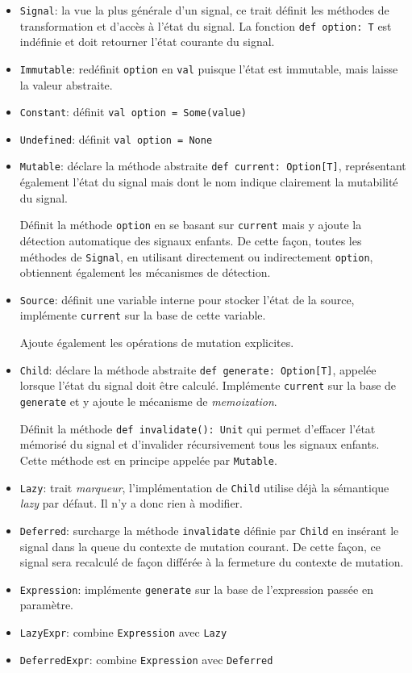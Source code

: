 \begin{itemize}
	\item \texttt{Signal}: la vue la plus générale d'un signal, ce trait définit les méthodes de transformation et d'accès à l'état du signal. La fonction \texttt{def option: T} est indéfinie et doit retourner l'état courante du signal.
	\item \texttt{Immutable}: redéfinit \texttt{option} en \texttt{val} puisque l'état est immutable, mais laisse la valeur abstraite.
	\item \texttt{Constant}: définit \texttt{val option = Some(value)}
	\item \texttt{Undefined}: définit \texttt{val option = None}
	\item \texttt{Mutable}: déclare la méthode abstraite \texttt{def current: Option[T]}, représentant également l'état du signal mais dont le nom indique clairement la mutabilité du signal.
	
	Définit la méthode \texttt{option} en se basant sur \texttt{current} mais y ajoute la détection automatique des signaux enfants. De cette façon, toutes les méthodes de \texttt{Signal}, en utilisant directement ou indirectement \texttt{option}, obtiennent également les mécanismes de détection.
	
	\item \texttt{Source}: définit une variable interne pour stocker l'état de la source, implémente \texttt{current} sur la base de cette variable.
	
	Ajoute également les opérations de mutation explicites.
	
	\item \texttt{Child}: déclare la méthode abstraite \texttt{def generate: Option[T]}, appelée lorsque l'état du signal doit être calculé. Implémente \texttt{current} sur la base de \texttt{generate} et y ajoute le mécanisme de \emph{memoization}.
	
	Définit la méthode \texttt{def invalidate(): Unit} qui permet d'effacer l'état mémorisé du signal et d'invalider récursivement tous les signaux enfants. Cette méthode est en principe appelée par \texttt{Mutable}.
	
	\item \texttt{Lazy}: trait \emph{marqueur}, l'implémentation de \texttt{Child} utilise déjà la sémantique \emph{lazy} par défaut. Il n'y a donc rien à modifier.
	
	\item \texttt{Deferred}: surcharge la méthode \texttt{invalidate} définie par \texttt{Child} en insérant le signal dans la queue du contexte de mutation courant. De cette façon, ce signal sera recalculé de façon différée à la fermeture du contexte de mutation.
	
	\item \texttt{Expression}: implémente \texttt{generate} sur la base de l'expression passée en paramètre.
	
	\item \texttt{LazyExpr}: combine \texttt{Expression} avec \texttt{Lazy}
	\item \texttt{DeferredExpr}: combine \texttt{Expression} avec \texttt{Deferred}
\end{itemize}

